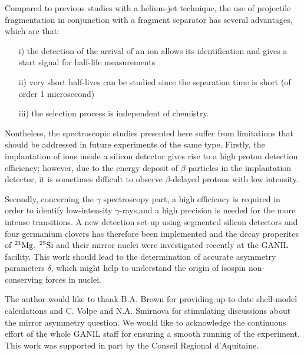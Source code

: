 \documentclass[UTF8]{ctexart}
\begin{document}
Compared to previous studies with a helium-jet technique, the use of projectile fragmentation in conjunction with a fragment separator has several advantages, which are that:
\begin{itemize}
    \item[i)] the detection of the arrival of an ion allows its identification and gives a start signal for half-life measurements
    \item[ii)] very short half-lives can be studied since the separation time is short (of order 1 microsecond)
    \item[iii)] the selection process is independent of chemistry. 
\end{itemize}

Nontheless, the spectroscopic studies presented here suffer from limitations that should be addressed in future experiments of the same type. Firstly, the implantation of ions inside a silicon detector gives rise to a high proton detection efficiency; however, due to the energy deposit of $\beta$-particles in the implantation detector, it is sometimes difficult to observe $\beta$-delayed protons with low intensity.

Secondly, concerning the $\gamma$ spectroscopy part, a high efficiency is required in order to identify low-intensity $\gamma$-rays,and  a high precision is needed for the more intense transitions. A new detection set-up using segmented silicon detectors and four germanium clovers has therefore been implemented and the decay properites of $^{21}\textnormal{Mg}$, $^{25}\textnormal{Si}$ and their mirror nuclei were investigated recently at the GANIL facility. This work should lead to the determination of accurate asymmetry parameters $\delta$, which might help to understand the origin of isospin non-conserving forces in nuclei.

The author would like to thank B.A. Brown for providing up-to-date shell-model calculations and C. Volpe and N.A. Smirnova for stimulating discussions about the mirror asymmetry question. We would like to acknowledge the continuous effort of the whole GANIL staff for ensuring a smooth running of the experiment. This work was supported in part by the Conseil Regional d'Aquitaine.
\end{document}
